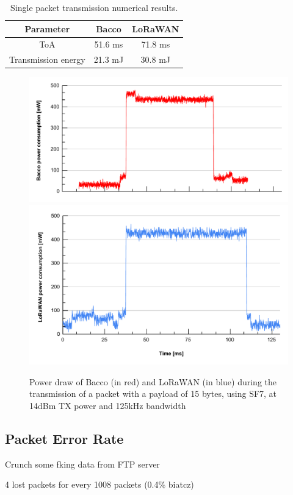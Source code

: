 \begin{table}[ht]
    \caption{Single packet transmission numerical results.}
    \label{tab: results}
    \centering
    \setlength{\extrarowheight}{7pt}
    \begin{tabular}{ |c|c|c| }
        \hline
        \textbf{Parameter} & \textbf{Bacco} & \textbf{LoRaWAN}\\
        \hline
        ToA & 51.6 ms & 71.8 ms\\
        Transmission energy & 21.3 mJ & 30.8 mJ\\
        \hline
    \end{tabular}
\end{table}

\begin{figure}[ht]
    \centering
    \includegraphics[width=1.0\textwidth]{images/bacco_SF7_14dbm_125khz_power.pdf}\\
    \vspace{-0.7cm}
    \includegraphics[width=1.0\textwidth]{images/lorawan_SF7_14dbm_125khz_power.pdf}
    \caption{Power draw of Bacco (in red) and LoRaWAN (in blue) during the transmission of a packet with a payload of 15
    bytes, using SF7, at 14dBm TX power and 125kHz bandwidth}
    \label{img: packet}
\end{figure}

\subsection{Packet Error Rate}
Crunch some fking data from FTP server

4 lost packets for every 1008 packets (0.4\% biatcz)
